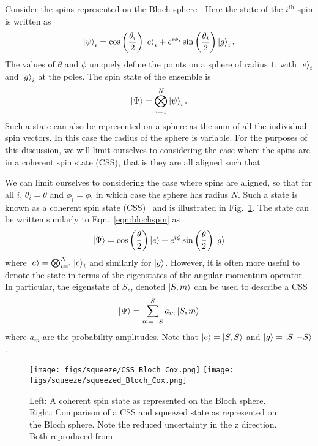 Consider the spins represented on the Bloch sphere \cite{PhysRevA.47.3554}.
Here the state of the $i^\text{th}$ spin is written as
%
\begin{equation}
  \ket{\psi}_i = \cos\left(\frac{\theta_i}{2}\right)\ket{e}_i +
  e^{i\phi_i}\sin\left(\frac{\theta_i}{2}\right)\ket{g}_i.
  \label{eqn:blochspin}
\end{equation}
%
The values of $\theta$ and $\phi$ uniquely define the points on a sphere of
radius $1$, with $\ket{e}_i$ and $\ket{g}_i$ at the poles. The spin state of
the ensemble is
%
\begin{equation}
  \ket{\Psi} = \bigotimes_{i=1}^N \ket{\psi}_i.
\end{equation}
Such a state can also be represented on a sphere as the sum of all the
individual spin vectors. In this case the radius of the sphere is variable. For
the purposes of this discussion, we will limit ourselves to considering the
case where the spins are in a coherent spin state (CSS), that is they are all
aligned such that 

We can limit ourselves to considering the case where spins are aligned,
so that for all $i$, $\theta_i = \theta$ and $\phi_i = \phi$, in which case the
sphere has radius $N$. Such a state is known as a coherent spin state
(CSS)~\cite{MA201189, Gazeau2009} and
is illustrated in Fig.~\ref{CSSbloch}. The state can be written similarly to
Eqn.~\ref{eqn:blochspin} as
%
\begin{equation}
  \ket{\Psi} = \cos\left(\frac{\theta}{2}\right)\ket{e} +
  e^{i\phi}\sin\left(\frac{\theta}{2}\right)\ket{g}
\end{equation}
%
where $\ket{e} = \bigotimes_{i=1}^N\ket{e}_i$ and similarly for $\ket{g}$.
However, it is often more useful to denote the state in terms of the
eigenstates of the angular momentum operator. In particular, the eigenstate of
$S_z$, denoted $\ket{S, m}$ can be used to describe a CSS
%
\begin{equation}
  \ket{\Psi} = \sum_{m=-S}^S a_m \ket{S, m}
\end{equation}
where $a_m$ are the probability amplitudes. Note that $\ket{e} = \ket{S, S}$
and $\ket{g} = \ket{S, -S}$.

\begin{figure}
  \centering
  \texttt{[image: figs/squeeze/CSS\_Bloch\_Cox.png]}
  \texttt{[image: figs/squeeze/squeezed\_Bloch\_Cox.png]}
  \caption{Left: A coherent spin state as represented on the Bloch sphere.
  Right: Comparison of a CSS and squeezed state as represented on the Bloch
  sphere. Note the reduced uncertainty in the z direction.
  Both reproduced from~\cite{Cox2016}}
  \label{CSSbloch}
\end{figure}

